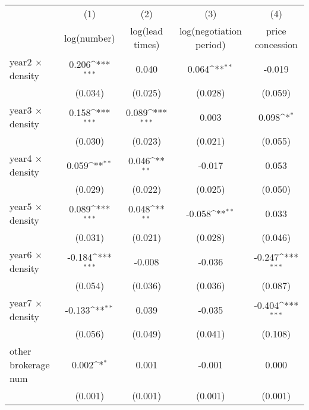 {
\def\sym#1{\ifmmode^{#1}\else\(^{#1}\)\fi}
\begin{tabular}{l*{4}{c}}
\toprule
            &\multicolumn{1}{c}{(1)}&\multicolumn{1}{c}{(2)}&\multicolumn{1}{c}{(3)}&\multicolumn{1}{c}{(4)}\\
            &\multicolumn{1}{c}{log(number)}&\multicolumn{1}{c}{log(lead times)}&\multicolumn{1}{c}{log(negotiation period)}&\multicolumn{1}{c}{price concession}\\
\midrule
year2 $\times$ density&       0.206\sym{***}&       0.040         &       0.064\sym{**} &      -0.019         \\
            &     (0.034)         &     (0.025)         &     (0.028)         &     (0.059)         \\
\addlinespace
year3 $\times$ density&       0.158\sym{***}&       0.089\sym{***}&       0.003         &       0.098\sym{*}  \\
            &     (0.030)         &     (0.023)         &     (0.021)         &     (0.055)         \\
\addlinespace
year4 $\times$ density&       0.059\sym{**} &       0.046\sym{**} &      -0.017         &       0.053         \\
            &     (0.029)         &     (0.022)         &     (0.025)         &     (0.050)         \\
\addlinespace
year5 $\times$ density&       0.089\sym{***}&       0.048\sym{**} &      -0.058\sym{**} &       0.033         \\
            &     (0.031)         &     (0.021)         &     (0.028)         &     (0.046)         \\
\addlinespace
year6 $\times$ density&      -0.184\sym{***}&      -0.008         &      -0.036         &      -0.247\sym{***}\\
            &     (0.054)         &     (0.036)         &     (0.036)         &     (0.087)         \\
\addlinespace
year7 $\times$ density&      -0.133\sym{**} &       0.039         &      -0.035         &      -0.404\sym{***}\\
            &     (0.056)         &     (0.049)         &     (0.041)         &     (0.108)         \\
\addlinespace
other brokerage num  &       0.002\sym{*}  &       0.001         &      -0.001         &       0.000         \\
            &     (0.001)         &     (0.001)         &     (0.001)         &     (0.001)         \\

\end{tabular}}
